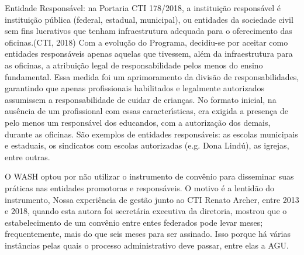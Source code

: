 \documentclass[
12pt,		%
openright,	%
twoside,  %
a4paper,			%
chapter=TITLE,		%
english,			%
french,				%
spanish,			%
brazil				%
]{USPSC-classe/USPSC}
\begin{document}
\begin{alineas}
\item Entidade Respons\'avel: na Portaria CTI 178/2018, a institui\c{c}\~ao respons\'avel \'e \textquotedbl institui\c{c}\~ao p\'ublica (federal, estadual, municipal), ou entidades da sociedade civil sem fins lucrativos que tenham infraestrutura adequada para o oferecimento das oficinas.\textquotedbl   (CTI, 2018)  Com a evolu\c{c}\~ao do Programa, decidiu-se por aceitar como entidades respons\'aveis apenas aquelas que tivessem, al\'em da infraestrutura para as oficinas, a atribui\c{c}\~ao legal de responsabilidade pelos menos do ensino fundamental. Essa medida foi um aprimoramento da divis\~ao de responsabilidades, garantindo que apenas profissionais habilitados e legalmente autorizados assumissem a responsabilidade de \textquotedbl cuidar de crian\c{c}as\textquotedbl . No formato inicial, na aus\^encia de um profissional com essas caracter\'{\i}sticas, era exigida a presen\c{c}a de pelo menos um respons\'avel dos educandos, com a autoriza\c{c}\~ao dos demais, durante as oficinas. S\~ao exemplos de entidades respons\'aveis: as escolas municipais e estaduais, os sindicatos com escolas autorizadas (e.g. Dona Lind\'u), as igrejas, entre outras.
\end{alineas}

O WASH optou por n\~ao utilizar o instrumento de conv\^enio para disseminar suas pr\'aticas nas entidades promotoras e respons\'aveis. O motivo \'e a lentid\~ao do instrumento, Nossa experi\^encia de gest\~ao junto ao CTI Renato Archer, entre 2013 e 2018, quando esta autora foi secret\'aria executiva da  diretoria, mostrou que o estabelecimento de um conv\^enio entre entes federados pode levar meses; frequentemente, mais do que seis meses para ser assinado. Isso porque h\'a v\'arias inst\^ancias pelas quais o processo administrativo deve passar, entre elas a AGU.
\end{document}
